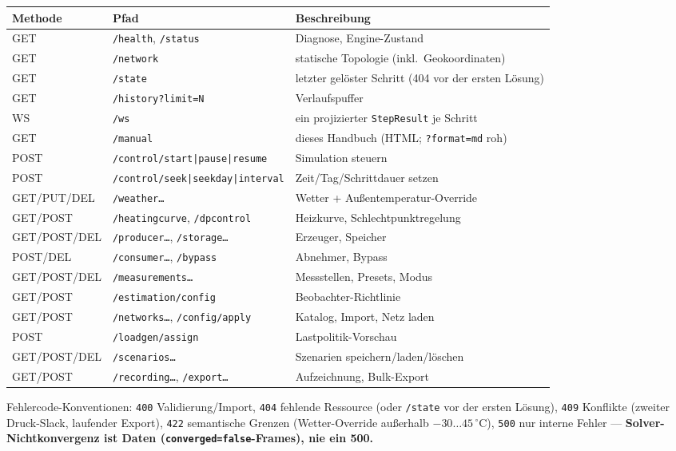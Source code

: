 \documentclass[11pt,a4paper,parskip=half]{scrreprt}
\newcommand{\api}[1]{\texttt{#1}}
\newcommand{\gC}{\,\ensuremath{{}^{\circ}\mathrm{C}}}
\begin{document}
{\small
\begin{longtable}{@{}p{}p{}p{}@{}}
\toprule
Methode & Pfad & Beschreibung \\
\midrule
\endhead
GET & \api{/health}, \api{/status} & Diagnose, Engine-Zustand \\
GET & \api{/network}               & statische Topologie (inkl.\ Geokoordinaten) \\
GET & \api{/state}                 & letzter gelöster Schritt (404 vor der ersten Lösung) \\
GET & \api{/history?limit=N}       & Verlaufspuffer \\
WS  & \api{/ws}                     & ein projizierter \texttt{StepResult} je Schritt \\
GET & \api{/manual}                & dieses Handbuch (HTML; \texttt{?format=md} roh) \\
POST& \api{/control/start|pause|resume} & Simulation steuern \\
POST& \api{/control/seek|seekday|interval} & Zeit/Tag/Schrittdauer setzen \\
GET/PUT/DEL & \api{/weather\ldots}  & Wetter + Außentemperatur-Override \\
GET/POST & \api{/heatingcurve}, \api{/dpcontrol} & Heizkurve, Schlechtpunktregelung \\
GET/POST/DEL & \api{/producer\ldots}, \api{/storage\ldots} & Erzeuger, Speicher \\
POST/DEL & \api{/consumer\ldots}, \api{/bypass} & Abnehmer, Bypass \\
GET/POST/DEL & \api{/measurements\ldots} & Messstellen, Presets, Modus \\
GET/POST & \api{/estimation/config} & Beobachter-Richtlinie \\
GET/POST & \api{/networks\ldots}, \api{/config/apply} & Katalog, Import, Netz laden \\
POST & \api{/loadgen/assign}        & Lastpolitik-Vorschau \\
GET/POST/DEL & \api{/scenarios\ldots} & Szenarien speichern/laden/löschen \\
GET/POST & \api{/recording\ldots}, \api{/export\ldots} & Aufzeichnung, Bulk-Export \\
\bottomrule
\end{longtable}}

Fehlercode-Konventionen: \texttt{400} Validierung/Import, \texttt{404} fehlende
Ressource (oder \api{/state} vor der ersten Lösung), \texttt{409} Konflikte
(zweiter Druck-Slack, laufender Export), \texttt{422} semantische Grenzen
(Wetter-Override außerhalb $-30\dots45\gC$), \texttt{500} nur interne Fehler ---
\textbf{Solver-Nichtkonvergenz ist Daten (\texttt{converged=false}-Frames), nie
ein 500.}
\end{document}
